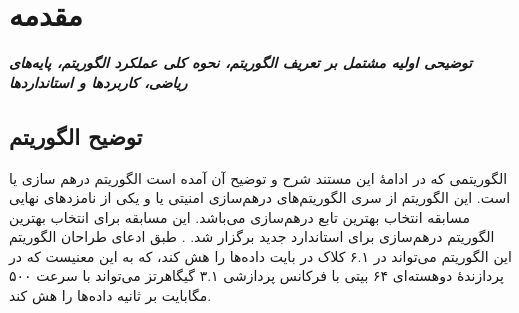 \chapter{مقدمه}
\noindent
\textbf{
\textit{
توضیحی اولیه مشتمل بر تعریف الگوریتم، نحوه کلی عملکرد الگوریتم، پایه‌های ریاضی، کاربردها و استانداردها
}
}
\pagebreak
\section{توضیح الگوریتم}
الگوریتمی که در ادامهٔ این مستند شرح و توضیح آن آمده است الگوریتم درهم سازی 
یا 
است. این الگوریتم از سری الگوریتم‌های درهم‌سازی امنیتی یا 
 و یکی از نامزدهای نهایی مسابقه انتخاب بهترین تابع درهم‌سازی 
 می‌باشد. این مسابقه برای انتخاب بهترین الگوریتم در‌هم‌سازی برای استاندارد جدید 
 برگزار شد.
 \cite{wikipedia}. 
 طبق ادعای طراحان الگوریتم این الگوریتم می‌تواند در ۶.۱ کلاک در بایت داده‌ها را هش کند، که به این معنیست که در پردازندهٔ دوهسته‌ای ۶۴ بیتی با فرکانس پردازشی ۳.۱ گیگاهرتز می‌تواند با سرعت 
 ۵۰۰ مگابایت بر ثانیه داده‌ها را هش کند. 
 
\begin{thebibliography}{1}


  
\end{thebibliography}
